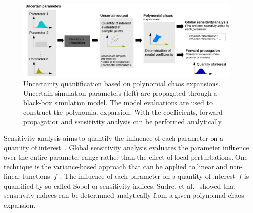 \begin{figure}[hbt!]
\includegraphics[width=\textwidth]{../figures/state-of-the-art/uq/polynomialchaosANDuq.pdf} 
\caption{Uncertainty quantification based on polynomial chaos expansions. Uncertain simulation parameters (left) are propagated through a black-box simulation model. The model evaluations are used to construct the polynomial expansion. With the coefficients, forward propagation and sensitivity analysis can be performed analytically. }
\label{fig:uqexpansionstate}
\end{figure}



Sensitivity analysis aims to quantify the influence of each parameter on a quantity of interest~\cite{smith-2014-math}. Global sensitivity analysis evaluates the parameter influence over the entire parameter range rather than the effect of local perturbations. One technique is the variance-based approach that can be applied to linear and non-linear functions~$f$~\cite{smith-2014-math}. The influence of each parameter on a quantity of interest~$f$ is quantified by so-called Sobol or sensitivity indices. Sudret et al.~\cite{sudret-2008-math} showed that sensitivity indices can be determined analytically from a given polynomial chaos expansion.


